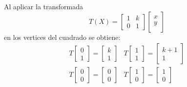 \documentclass[12pt]{article}
\begin{document}
Al aplicar la transformada
\begin{equation}
    T(X) = \left[\begin{array}{cc}
    1 & k \\
    0 & 1 
    \end{array}\right] 
    \left[
    \begin{array}{c}
            x\\
            y\\
    \end{array}
    \right]
\end{equation}
en los vertices del cuadrado se obtiene:
\begin{equation}
    \begin{matrix}
    T\begin{bmatrix}
        0 \\ 
        1
     \end{bmatrix} = \begin{bmatrix}
            k \\ 
            1
       \end{bmatrix} &
    
    T \begin{bmatrix}
        1 \\ 
        1
    \end{bmatrix} = \begin{bmatrix}
        k+1 \\ 
        1
    \end{bmatrix}\\ 
    
    T \begin{bmatrix}
        0 \\ 
        0
    \end{bmatrix} = \begin{bmatrix}
        0 \\ 
        0
    \end{bmatrix} &
    
    T \begin{bmatrix}
        1 \\ 
        0
    \end{bmatrix} = \begin{bmatrix}
        1 \\ 
        0
    \end{bmatrix}\\ 
    \end{matrix}
\end{equation}
\end{document}
